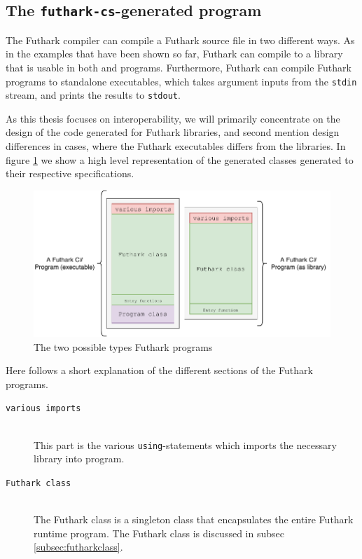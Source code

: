 \begin{description}
\clearpage

\section{The \texttt{futhark-cs}-generated \csharp{} program}
The Futhark \csharp{} compiler can compile a Futhark source file in two
different ways. As in the examples that have been shown so far, Futhark can
compile to a library that is usable in both \csharp{} and \fsharp{} programs.
Furthermore, Futhark can compile Futhark programs to standalone executables,
which takes argument inputs from the \texttt{stdin} stream, and prints the
results to \texttt{stdout}.

As this thesis focuses on interoperability, we will primarily concentrate on the
design of the \csharp{} code generated for Futhark libraries, and second mention
design differences in cases, where the Futhark executables differs from the libraries.
In figure \ref{fig:futharkcsclasses} we show a high level representation of the
generated \csharp{} classes generated to their respective specifications.

\begin{figure}[h]
  \centering
  \includegraphics[scale=0.85]{chapters/figs/csharp/futharkcs_wide.pdf}
  \caption{The two possible types Futhark \csharp{} programs}
  \label{fig:futharkcsclasses}
\end{figure}

Here follows a short explanation of the different sections of the Futhark
programs.
\begin{description}
\item[\texttt{various imports}] \hfill \\
  This part is the various \texttt{using}-statements which imports the necessary
  library into \csharp{} program.
  
\item[\texttt{Futhark class}] \hfill \\
  The Futhark class is a singleton class that encapsulates the entire Futhark
  runtime program. The Futhark class is discussed in subsec \ref{subsec:futharkclass}.
  

\end{description}
\end{description}
